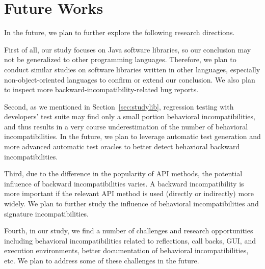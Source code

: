 \section{Future Works}
\label{sec:future}
In the future, we plan to further explore the following research directions. 

First of all, our study focuses on Java software libraries, so our conclusion may not be generalized to other programming languages. Therefore, we plan to conduct similar studies on software libraries written in other languages, especially non-object-oriented languages to confirm or extend our conclusion. We also plan to inspect more backward-incompatibility-related bug reports. 

Second, as we mentioned in Section~\ref{sec:studylib}, regression testing with developers' test suite may find only a small portion behavioral incompatibilities, and thus results in a very course underestimation of the number of behavioral incompatibilities. In the future, we plan to leverage automatic test generation and more advanced automatic test oracles to better detect behavioral backward incompatibilities. 

Third, due to the difference in the popularity of API methods, the potential influence of backward incompatibilities varies. A backward incompatibility is more important if the relevant API method is used (directly or indirectly) more widely. We plan to further study the influence of behavioral incompatibilities and signature incompatibilities. 

Fourth, in our study, we find a number of challenges and research opportunities including behavioral incompatibilities related to reflections, call backs, GUI, and execution environments, better documentation of behavioral incompatibilities, etc. We plan to address some of these challenges in the future. 